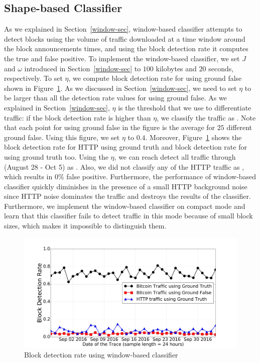 \subsection{Shape-based Classifier}
As we explained in Section~\ref{window-sec}, window-based classifier attempts to detect \bc blocks using the volume of traffic downloaded at a time window around the block announcements times, and using the block detection rate it computes the true and false positive.
To implement the window-based classifier, we set $J$ and $\omega$ introduced in Section~\ref{window-sec} to $100$ kilobytes and $20$ seconds, respectively. 
To set $\eta$, we compute block detection rate for \bc using ground false shown in Figure~\ref{fig:window}. As we discussed in Section~\ref{window-sec}, we need to set $\eta$ to be larger than all the detection rate values for \bc using ground false. 
As we explained in Section~\ref{window-sec}, $\eta$ is the threshold that we use to differentiate \bc traffic: if the block detection rate is higher than $\eta$, we classify the traffic as \bc. Note that each point for \bc using ground false in the figure is the average for $25$ different ground false. Using this figure, we set $\eta$ to $0.4$. Moreover, Figure~\ref{fig:window} shows the block detection rate for HTTP using ground truth and block detection rate for \bc using ground truth too. Using the $\eta$, we can reach detect all \bc traffic through (August 28 - Oct 5) as \bc. Also, we did not classify any of the HTTP traffic as \bc, which results in $0\%$ false positive. Furthermore, the performance of window-based classifier quickly diminishes in the presence of a small HTTP background noise since HTTP noise dominates the \bc traffic and destroys the results of the classifier. Furthermore, we implement the window-based classifier on \bc compact mode and learn that this classifier fails to detect \bc traffic in this mode because of small block sizes, which makes it impossible to distinguish them.



\begin{figure}
\centering
\includegraphics[scale=0.15]{image/jan25/window.pdf}%
\caption{Block detection rate using window-based classifier}
\label{fig:window}
\end{figure}
